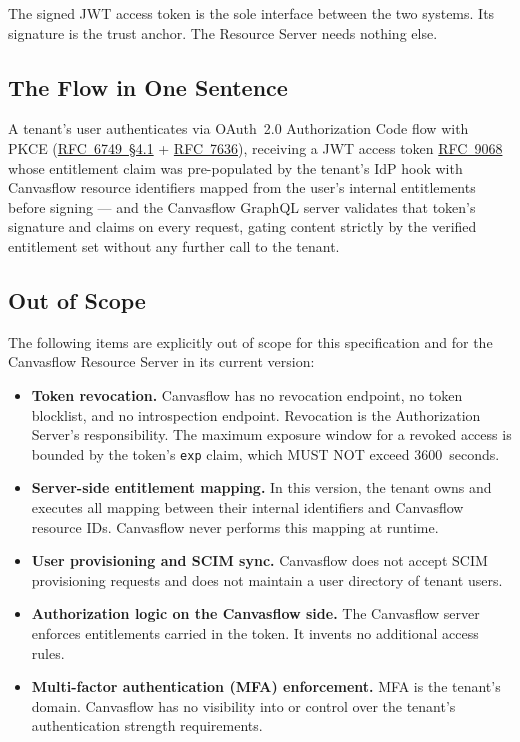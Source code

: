 The signed JWT access token is the sole interface between the two systems. Its signature
is the trust anchor. The Resource Server needs nothing else.

\subsection{The Flow in One Sentence}

A tenant's user authenticates via OAuth~2.0 Authorization Code flow with PKCE \linebreak
(\href{https://datatracker.ietf.org/doc/html/rfc6749#section-4.1}{RFC~6749~\S4.1} + 
\href{https://datatracker.ietf.org/doc/html/rfc7636}{RFC~7636}), receiving a JWT access token 
\href{https://datatracker.ietf.org/doc/html/rfc9068}{RFC~9068} whose entitlement
claim was pre-populated by the tenant's IdP hook with Canvasflow resource identifiers
mapped from the user's internal entitlements before signing --- and the Canvasflow
GraphQL server validates that token's signature and claims on every request, gating
content strictly by the verified entitlement set without any further call to the tenant.

\pagebreak

\subsection{Out of Scope}\label{sec:out-of-scope}

The following items are explicitly out of scope for this specification and for the
Canvasflow Resource Server in its current version:

\begin{itemize}
  \item \textbf{Token revocation.} Canvasflow has no revocation endpoint, no token
    blocklist, and no introspection endpoint. Revocation is the Authorization Server's
    responsibility. The maximum exposure window for a revoked access is bounded by the
    token's \texttt{exp} claim, which MUST NOT exceed 3600~seconds.

  \item \textbf{Server-side entitlement mapping.} In this version, the
    tenant owns and executes all mapping between their internal identifiers and
    Canvasflow resource IDs. Canvasflow never performs this mapping at runtime.

  \item \textbf{User provisioning and SCIM sync.} Canvasflow does not accept SCIM
    provisioning requests and does not maintain a user directory of tenant users.

  \item \textbf{Authorization logic on the Canvasflow side.} The Canvasflow server
    enforces entitlements carried in the token. It invents no additional access rules.

  \item \textbf{Multi-factor authentication (MFA) enforcement.} MFA is the tenant's
    domain. Canvasflow has no visibility into or control over the tenant's authentication
    strength requirements.
\end{itemize}

